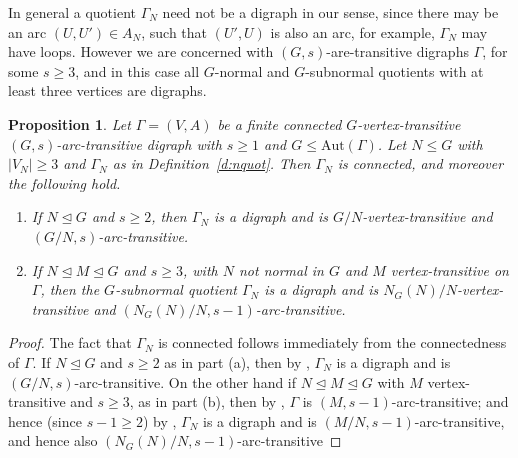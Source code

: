 \documentclass[11pt]{amsart}
\newtheorem{proposition}[theorem]{Proposition}
\newtheorem{definition}[theorem]{Definition}
\newcommand{\Aut}{\mathrm{Aut}}
\begin{document}
In general a quotient $\Gamma_N$ need not be a digraph in our sense, since there may be an arc $(U,U')\in A_N$, such that $(U',U)$ is also an arc, for example, $\Gamma_N$ may have loops.  However we are concerned with $(G,s)$-are-transitive digraphs $\Gamma$, for some $s\geq3$, and in this case all $G$-normal and $G$-subnormal quotients with at least three vertices are digraphs.  



\begin{proposition}\label{p:quot}
   Let \(\Gamma=(V,A)\) be a finite connected $G$-vertex-transitive  \((G,s)\)-arc-transitive digraph with \(s\geqslant1\) and $G\leq\Aut(\Gamma)$. Let $N\leq G$ with $|V_N|\geq3$ and $\Gamma_N$ as in Definition~\ref{d:nquot}. Then $\Gamma_N$ is connected, and moreover the following hold.
   \begin{enumerate}
       \item[(a)] If $N\unlhd G$ and  \(s\geqslant2\), then $\Gamma_N$ is a digraph and is $G/N$-vertex-transitive and $(G/N,s)$-arc-transitive. 
       \item[(b)] If $N\unlhd M\unlhd G$ and  \(s\geqslant3\), with $N$ not normal in $G$ and $M$ vertex-transitive on $\Gamma$, then the $G$-subnormal quotient $\Gamma_N$ is a digraph and is $N_G(N)/N$-vertex-transitive and  $(N_G(N)/N,s-1)$-arc-transitive. 
   \end{enumerate} 
\end{proposition}




\begin{proof}
    The fact that $\Gamma_N$ is connected follows immediately from the connectedness of $\Gamma$. If $N\unlhd G$ and  \(s\geqslant2\) as in part (a), then by \cite[Lemma 3.2]{Praeger}, $\Gamma_N$ is a digraph and is $(G/N,s)$-arc-transitive. On the other hand if $N\unlhd M\unlhd G$ with $M$ vertex-transitive and  \(s\geqslant3\), as in part (b), then by \cite[Corollary 2.11]{quasi}, $\Gamma$ is $(M,s-1)$-arc-transitive; and hence (since $s-1\geq2$) by \cite[Lemma 3.2]{Praeger}, $\Gamma_N$ is a digraph and is $(M/N,s-1)$-arc-transitive, and hence also  
    $(N_G(N)/N,s-1)$-arc-transitive
    \end{proof}
\end{document}
